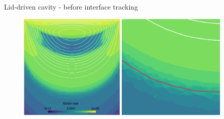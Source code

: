 \documentclass{beamer}  %
\begin{document}
\begin{frame}{Lid-driven cavity - before interface tracking}
    \begin{figure}
        \centering
        \includegraphics[width=0.45\textwidth]{../figures/cavity_init.pdf}
        \pause
        \hspace{6pt}
        \includegraphics[width=0.46\textwidth]{../figures/cavity_init_crop.pdf}
    \end{figure}
\end{frame}
\end{document}

